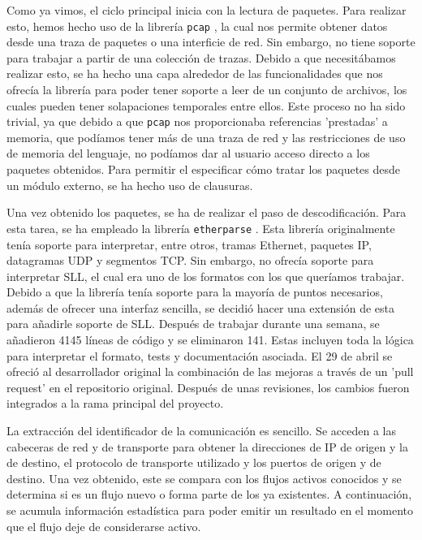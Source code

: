 \documentclass[10pt,a4paper,twoside]{article}
\begin{document}
\begin{multicols*}{2}
    Como ya vimos, el ciclo principal inicia con la lectura de paquetes. Para realizar esto, hemos hecho uso de la librería \texttt{pcap} \cite{rustpcap}, la cual nos permite obtener datos desde una traza de paquetes o una interficie de red. Sin embargo, no tiene soporte para trabajar a partir de una colección de trazas. Debido a que necesitábamos realizar esto, se ha hecho una capa alrededor de las funcionalidades que nos ofrecía la librería para poder tener soporte a leer de un conjunto de archivos, los cuales pueden tener solapaciones temporales entre ellos. Este proceso no ha sido trivial, ya que debido a que \texttt{pcap} nos proporcionaba referencias 'prestadas' a memoria, que podíamos tener más de una traza de red y las restricciones de uso de memoria del lenguaje, no podíamos dar al usuario acceso directo a los paquetes obtenidos. Para permitir el especificar cómo tratar los paquetes desde un módulo externo, se ha hecho uso de clausuras.

    Una vez obtenido los paquetes, se ha de realizar el paso de descodificación. Para esta tarea, se ha empleado la librería \texttt{etherparse} \cite{etherparse}. Esta librería originalmente tenía soporte para interpretar, entre otros, tramas Ethernet, paquetes IP, datagramas UDP y segmentos TCP. Sin embargo, no ofrecía soporte para interpretar SLL, el cual era uno de los formatos con los que queríamos trabajar. Debido a que la librería tenía soporte para la mayoría de puntos necesarios, además de  ofrecer una interfaz sencilla, se decidió hacer una extensión de esta para añadirle soporte de SLL. Después de trabajar durante una semana, se añadieron 4145 líneas de código y se eliminaron 141. Estas incluyen toda la lógica para interpretar el formato, tests y documentación asociada. El 29 de abril se ofreció al desarrollador original la combinación de las mejoras a través de un 'pull request' \cite{slladdsllpr} en el repositorio original. Después de unas revisiones, los cambios fueron integrados a la rama principal del proyecto.

    La extracción del identificador de la comunicación es sencillo. Se acceden a las cabeceras de red y de transporte para obtener la direcciones de IP de origen y la de destino, el protocolo de transporte utilizado y los puertos de origen y de destino. Una vez obtenido, este se compara con los flujos activos conocidos y se determina si es un flujo nuevo o forma parte de los ya existentes. A continuación, se acumula información estadística para poder emitir un resultado en el momento que el flujo deje de considerarse activo.


\end{multicols*}
\end{document}

